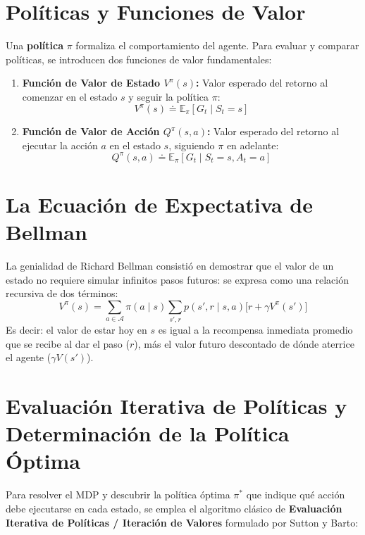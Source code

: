 \section{Políticas y Funciones de Valor}
Una \textbf{política} $\pi$ formaliza el comportamiento del agente. Para evaluar y comparar políticas, se introducen dos funciones de valor fundamentales:
\begin{enumerate}
  \item \textbf{Función de Valor de Estado $V^\pi(s)$:} Valor esperado del retorno al comenzar en el estado $s$ y seguir la política $\pi$:
  \begin{equation}
    V^\pi(s) \doteq \mathbb{E}_\pi [G_t \mid S_t = s]
  \end{equation}
  \item \textbf{Función de Valor de Acción $Q^\pi(s, a)$:} Valor esperado del retorno al ejecutar la acción $a$ en el estado $s$, siguiendo $\pi$ en adelante:
  \begin{equation}
    Q^\pi(s, a) \doteq \mathbb{E}_\pi [G_t \mid S_t = s, A_t = a]
  \end{equation}
\end{enumerate}

\section{La Ecuación de Expectativa de Bellman}
La genialidad de Richard Bellman consistió en demostrar que el valor de un estado no requiere simular infinitos pasos futuros: se expresa como una relación recursiva de dos términos:
\begin{equation}
  V^\pi(s) = \sum_{a \in \mathcal{A}} \pi(a \mid s) \sum_{s', r} p(s', r \mid s, a) \Big[ r + \gamma V^\pi(s') \Big]
\end{equation}
Es decir: el valor de estar hoy en $s$ es igual a la recompensa inmediata promedio que se recibe al dar el paso ($r$), más el valor futuro descontado de dónde aterrice el agente ($\gamma V(s')$).

\section{Evaluación Iterativa de Políticas y Determinación de la Política Óptima}
Para resolver el MDP y descubrir la política óptima $\pi^*$ que indique qué acción debe ejecutarse en cada estado, se emplea el algoritmo clásico de \textbf{Evaluación Iterativa de Políticas / Iteración de Valores} formulado por Sutton y Barto:

